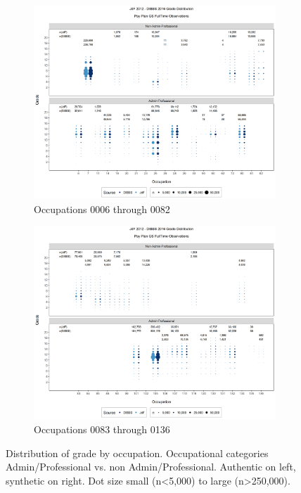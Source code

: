 \documentclass[10pt, letterpaper]{article}
\begin{document}
\begin{spacing}{1.0}
\clearpage

\begin{figure}[]
    \centering
    \begin{subfigure}{1\textwidth}
        \centering
        \includegraphics[width=6in, trim={0 0.55in 0 0.75in}, clip]{JdFDIBBSGSFullTimeGradeAdminProfessionalOccupation1.png}
        \caption{Occupations 0006 through 0082}
        \vspace{10pt}
    \end{subfigure}
    \begin{subfigure}{1\textwidth}
        \centering
        \includegraphics[width=6in, trim={0 0.55in 0 0.75in}, clip]{JdFDIBBSGSFullTimeGradeAdminProfessionalOccupation21.png}
        \caption{Occupations 0083 through 0136}
    \end{subfigure}
    \caption{Distribution of grade by occupation.  Occupational categories Admin/Professional vs. non Admin/Professional.  Authentic on left, synthetic on right.  Dot size small (n<5,000) to large (n>250,000).}
    \label{figure:JdFDIBBSGSFullTimeGradeAdminProfessionalOccupation}
\end{figure}


\end{spacing}
\end{document}
